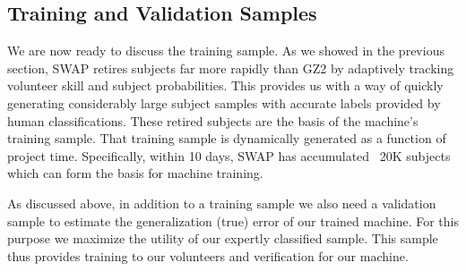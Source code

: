\documentclass[twocolumn]{aastex6}
\begin{document}

\subsection{Training and Validation Samples}
We are now ready to discuss the training sample. As we showed in the previous 
section, SWAP retires subjects far more rapidly than GZ2
by adaptively tracking volunteer skill and subject probabilities. This provides us
with a way of quickly generating considerably large subject samples with accurate
labels provided by human classifications. These retired subjects are the basis of the 
machine's training sample. That training sample is dynamically generated as a function
of project time. Specifically, within 10 days, SWAP has accumulated ~20K 
subjects which can form the basis for machine training. 

As discussed above, in addition to a training sample we also need a validation 
sample to estimate the generalization (true) error of our trained machine. For 
this purpose we maximize the utility of our expertly classified sample. This sample
thus provides training to our volunteers and verification for our machine. 
\end{document}
